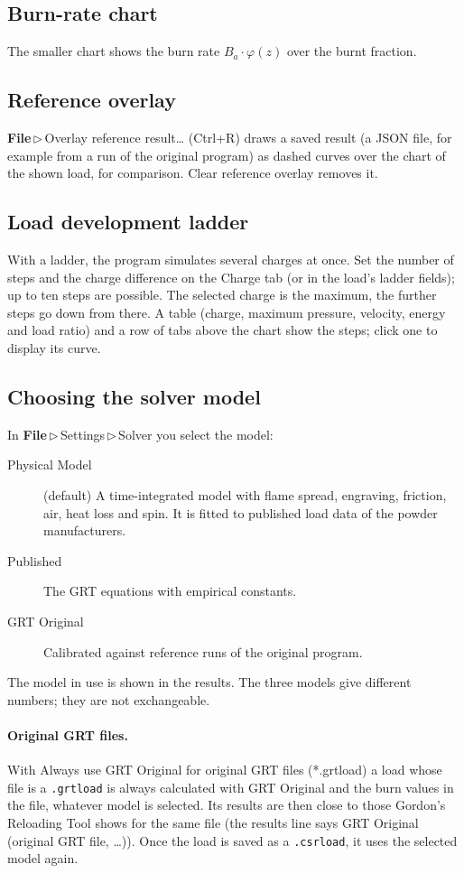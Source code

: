 \documentclass[11pt,a4paper]{article}
\newcommand{\ui}[1]{\textsf{#1}}
\newcommand{\menu}[1]{\textsf{\textbf{#1}}}
\newcommand{\sep}{\,$\triangleright$\,}
\newcommand{\file}[1]{\texttt{#1}}
\begin{document}
\subsection{Burn-rate chart}
The smaller chart shows the burn rate $B_a\cdot\varphi(z)$ over the burnt fraction.

\subsection{Reference overlay}
\menu{File}\sep\ui{Overlay reference result\dots} (Ctrl+R) draws a saved result (a JSON file, for example from a run of the original program) as dashed
curves over the chart of the shown load, for comparison. \ui{Clear reference overlay} removes it.

\subsection{Load development ladder}
With a ladder, the program simulates several charges at once. Set the number of steps and the charge difference on the \ui{Charge} tab (or in the load's ladder fields); up to
ten steps are possible. The selected charge is the maximum, the further steps go down from there. A table (charge, maximum pressure, velocity, energy
and load ratio) and a row of tabs above the chart show the steps; click one to display its curve.

\subsection{Choosing the solver model}\label{sec:solver}
In \menu{File}\sep\ui{Settings}\sep\ui{Solver} you select the model:
\begin{description}
  \item[Physical Model] (default) A time-integrated model with flame spread, engraving, friction, air, heat loss and spin. It is fitted to published
        load data of the powder manufacturers.
  \item[Published] The GRT equations with empirical constants.
  \item[GRT Original] Calibrated against reference runs of the original program.
\end{description}
The model in use is shown in the results. The three models give different numbers; they are not exchangeable.

\paragraph{Original GRT files.} With \ui{Always use GRT Original for original GRT files (*.grtload)} a load whose file is a \file{.grtload} is
always calculated with GRT Original and the burn values in the file, whatever model is selected. Its results are then close to those Gordon's
Reloading Tool shows for the same file (the results line says \ui{GRT Original (original GRT file, \dots)}). Once the load is saved as a
\file{.csrload}, it uses the selected model again.
\end{document}
